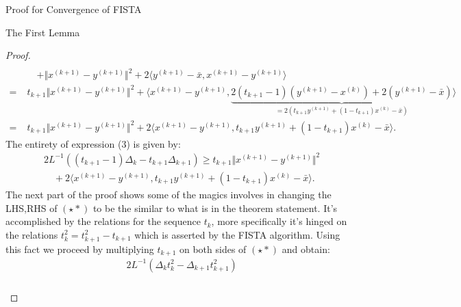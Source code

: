 \documentclass[]{article}
\theoremstyle{definition}
\begin{document}
\begin{section}{Proof for Convergence of FISTA}
\begin{subsection}{The First Lemma}
\begin{proof}
\begin{align*}
                \\
                & \quad 
                + \Vert x^{(k + 1)} - y^{(k + 1)}\Vert^2
                + 
                2\langle y^{(k + 1)} - \bar x, x^{(k + 1)} - y^{(k + 1)}\rangle
                \\
                = \; &
                t_{k + 1}\Vert x^{(k + 1)} - y^{(k + 1)}\Vert^2
                + 
                \langle 
                    x^{(k + 1)} - y^{(k + 1)}, 
                    \underbrace{2(t_{k + 1} - 1)(y^{(k + 1)} - x^{(k)}) + 2(y^{(k + 1)} - \bar x) }_
                    {
                        = 2(t_{k + 1}y^{(k + 1)} + (1 - t_{k + 1})x^{(k)} - \bar x)
                    }
                \rangle
                \\
                = \; & 
                t_{k + 1}\Vert x^{(k + 1)} - y^{(k + 1)}\Vert^2
                + 
                2\langle 
                    x^{(k + 1)} - y^{(k + 1)}, 
                    t_{k + 1}y^{(k + 1)} + (1 - t_{k + 1})x^{(k)} - \bar x
                \rangle. 
                \tag{$\star *$RHS}
            \end{align*}
            The entirety of expression (3) is given by: 
            \begin{align*}
                & 2L^{-1}((t_{k + 1} - 1)\Delta_k - t_{k + 1}\Delta_{k + 1})
                \ge 
                t_{k + 1}\Vert x^{(k + 1)} - y^{(k + 1)}\Vert^2
                \\
                & \quad 
                + 
                2\langle 
                    x^{(k + 1)} - y^{(k + 1)}, 
                    t_{k + 1}y^{(k + 1)} + (1 - t_{k + 1})x^{(k)} - \bar x
                \rangle. 
                \tag{$\star *$}
            \end{align*}
            The next part of the proof shows some of the magics involves in changing the LHS,RHS of $(\star *)$ to be the similar to what is in the theorem statement. It's accomplished by the relations for the sequence $t_k$, more specifically it's hinged on the relations $t_k^2 = t^2_{k + 1} - t_{k + 1}$ which is asserted by the FISTA algorithm. Using this fact we proceed by multiplying $t_{k + 1}$ on both sides of $(\star *)$ and obtain: 
            \begin{align*}
                & 2L^{-1}(\Delta_k t_k^2 - \Delta_{k + 1}t_{k + 1}^2)
                \\
                & \hspace{2em}
                \begin{aligned}

\end{aligned}
\end{align*}
\end{proof}
\end{subsection}
\end{section}
\end{document}

